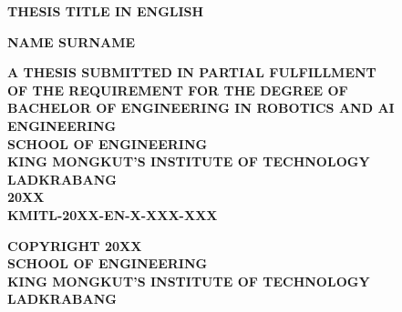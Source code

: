 \documentclass[12pt,a4paper]{report}
\begin{document}
\begin{titlepage}
    \fontsize{18pt}{18pt}\bfseries THESIS TITLE IN ENGLISH \\[1.5em]
    \centering
    \vfill
    \begin{center}
        {\fontsize{18pt}{18pt}\bfseries NAME SURNAME\par}
    \end{center}
    \vfill
    \vfill
    {\fontsize{18pt}{18pt}\bfseries
    A THESIS SUBMITTED IN PARTIAL FULFILLMENT \\ OF THE REQUIREMENT FOR THE DEGREE OF \\ BACHELOR OF ENGINEERING IN ROBOTICS AND AI ENGINEERING \\ SCHOOL OF ENGINEERING \\ KING MONGKUT'S INSTITUTE OF TECHNOLOGY LADKRABANG \\ 20XX \\ KMITL-20XX-EN-X-XXX-XXX}
\end{titlepage}

\newpage
\thispagestyle{empty}
\vspace*{\fill}
    {\fontsize{18pt}{18pt}\bfseries
    \noindent
    COPYRIGHT 20XX \\
    SCHOOL OF ENGINEERING \\
    KING MONGKUT'S INSTITUTE OF TECHNOLOGY LADKRABANG}

\newpage




\cleardoublepage

\tableofcontents
{}


\cleardoublepage
{}







\cite{zhang2023design}

\cleardoublepage
{}



\appendix

\end{document}
